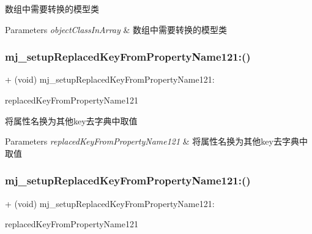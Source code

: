 数组中需要转换的模型类


\begin{DoxyParams}{Parameters}
{\em object\+Class\+In\+Array} & 数组中需要转换的模型类 \\
\hline
\end{DoxyParams}
\mbox{\label{category_n_s_object_07_m_j_property_08_a65ca79a4eb9d05d554c0420b95afe471}} 
\subsubsection{\texorpdfstring{mj\+\_\+setup\+Replaced\+Key\+From\+Property\+Name121\+:()}{mj\_setupReplacedKeyFromPropertyName121:()}\hspace{0.1cm}{\footnotesize\ttfamily [1/3]}}
{\footnotesize\ttfamily + (void) mj\+\_\+setup\+Replaced\+Key\+From\+Property\+Name121\+: \begin{DoxyParamCaption}\item[{(M\+J\+Replaced\+Key\+From\+Property\+Name121)}]{replaced\+Key\+From\+Property\+Name121 }\end{DoxyParamCaption}}

将属性名换为其他key去字典中取值


\begin{DoxyParams}{Parameters}
{\em replaced\+Key\+From\+Property\+Name121} & 将属性名换为其他key去字典中取值 \\
\hline
\end{DoxyParams}
\mbox{\label{category_n_s_object_07_m_j_property_08_a65ca79a4eb9d05d554c0420b95afe471}} 
\subsubsection{\texorpdfstring{mj\+\_\+setup\+Replaced\+Key\+From\+Property\+Name121\+:()}{mj\_setupReplacedKeyFromPropertyName121:()}\hspace{0.1cm}{\footnotesize\ttfamily [2/3]}}
{\footnotesize\ttfamily + (void) mj\+\_\+setup\+Replaced\+Key\+From\+Property\+Name121\+: \begin{DoxyParamCaption}\item[{(M\+J\+Replaced\+Key\+From\+Property\+Name121)}]{replaced\+Key\+From\+Property\+Name121 }\end{DoxyParamCaption}}

